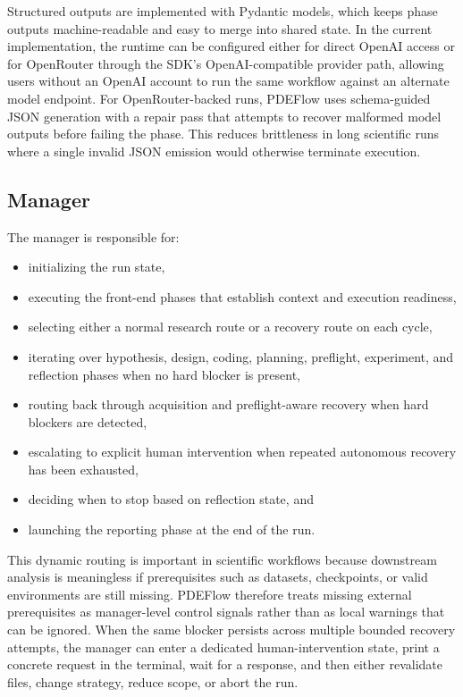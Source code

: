 \documentclass[11pt]{article}
\begin{document}
Structured outputs are implemented with Pydantic models, which keeps phase outputs machine-readable and easy to merge into shared state. In the current implementation, the runtime can be configured either for direct OpenAI access or for OpenRouter through the SDK's OpenAI-compatible provider path, allowing users without an OpenAI account to run the same workflow against an alternate model endpoint. For OpenRouter-backed runs, PDEFlow uses schema-guided JSON generation with a repair pass that attempts to recover malformed model outputs before failing the phase. This reduces brittleness in long scientific runs where a single invalid JSON emission would otherwise terminate execution.

\subsection{Manager}
The manager is responsible for:
\begin{itemize}[leftmargin=1.5em]
  \item initializing the run state,
  \item executing the front-end phases that establish context and execution readiness,
  \item selecting either a normal research route or a recovery route on each cycle,
  \item iterating over hypothesis, design, coding, planning, preflight, experiment, and reflection phases when no hard blocker is present,
  \item routing back through acquisition and preflight-aware recovery when hard blockers are detected,
  \item escalating to explicit human intervention when repeated autonomous recovery has been exhausted,
  \item deciding when to stop based on reflection state, and
  \item launching the reporting phase at the end of the run.
\end{itemize}

This dynamic routing is important in scientific workflows because downstream analysis is meaningless if prerequisites such as datasets, checkpoints, or valid environments are still missing. PDEFlow therefore treats missing external prerequisites as manager-level control signals rather than as local warnings that can be ignored. When the same blocker persists across multiple bounded recovery attempts, the manager can enter a dedicated human-intervention state, print a concrete request in the terminal, wait for a response, and then either revalidate files, change strategy, reduce scope, or abort the run.
\end{document}
